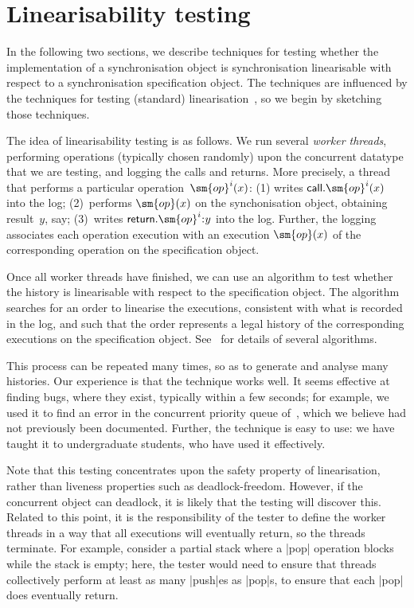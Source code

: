 \section{Linearisability testing}
\label{sec:lin-testing}

In the following two sections, we describe techniques for testing whether the
implementation of a synchronisation object is synchronisation linearisable
with respect to a synchronisation specification object.
%
The techniques are influenced by the techniques for testing (standard)
linearisation~\cite{gavin:lin-testing}, so we begin by sketching those
techniques.

The idea of linearisability testing is as follows.  We run several
\emph{worker threads}, performing operations (typically chosen randomly) upon
the concurrent datatype that we are testing, and logging the calls and
returns.  More precisely, a thread that performs a particular
operation~$\sm{op}^i(x)$: (1) writes $\call.\sm{op}^i(x)$ into the log;
(2)~performs $\sm{op}(x)$ on the synchonisation object, obtaining result~$y$,
say; (3)~writes $\return.\sm{op}^i \:: y$ into the log.  Further, the logging
associates each operation execution with an execution $\sm{op}(x)$ of the
corresponding operation on the specification object.

Once all worker threads have finished, we can use an algorithm to test whether
the history is linearisable with respect to the specification object.  The
algorithm searches for an order to linearise the executions, consistent with
what is recorded in the log, and such that the order represents a legal
history of the corresponding executions on the specification object.
See~\cite{gavin:lin-testing} for details of several algorithms.

This process can be repeated many times, so as to generate and analyse many
histories.  Our experience is that the technique works well.  It seems
effective at finding bugs, where they exist, typically within a few seconds;
for example, we used it to find an error in the concurrent priority queue
of~\cite{faulty-pri-queue}, which we believe had not previously been
documented.  Further, the technique is easy to use: we have taught it to
undergraduate students, who have used it effectively.

Note that this testing concentrates upon the safety property of
linearisation, rather than liveness properties such as deadlock-freedom.
However, if the concurrent object can deadlock, it is likely that the testing
will discover this.  Related to this point, it is the responsibility of the
tester to define the worker threads in a way that all executions will
eventually return, so the threads terminate.  For example, consider a partial
stack where a |pop| operation blocks while the stack is empty; here, the
tester would need to ensure that threads collectively perform at least as many
|push|es as |pop|s, to ensure that each |pop| does eventually return.

